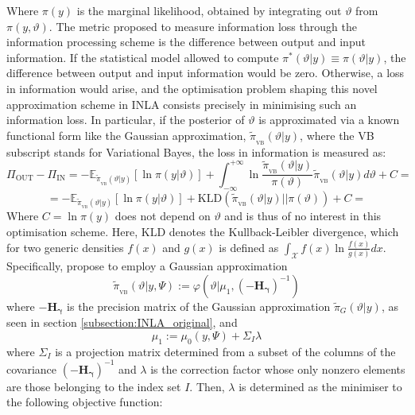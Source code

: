 \documentclass[openany, 11pt, oneside]{book}
\begin{document}
Where $\pi(y)$ is the marginal likelihood, obtained by integrating out $\vartheta$ from $\pi(y,\vartheta)$. The metric \cite{Zellner1988} proposed to measure information loss through the information processing scheme is the difference between output and input information. If the statistical model allowed to compute $\pi^*(\vartheta \vert y) \equiv \pi(\vartheta \vert y)$, the difference between output and input information would be zero. Otherwise, a loss in information would arise, and the optimisation problem shaping this novel approximation scheme in INLA consists precisely in minimising such an information loss. In particular, if the posterior of $\vartheta$ is approximated via a known functional form like the Gaussian approximation, $\tilde{\pi}_\mathrm{_{VB}}(\vartheta \vert y)$, where the VB subscript stands for Variational Bayes, the loss in information is measured as:
$$
\Pi_\mathrm{OUT} - \Pi_\mathrm{IN} = 
-\mathbb{E}_{\tilde{\pi}_\mathrm{_{VB}}(\vartheta\vert y)}\left[ \ln\pi(y \vert \vartheta)\right]+
\int_{-\infty}^{+\infty} \ln\frac{\tilde{\pi}_\mathrm{_{VB}}(\vartheta \vert y)}{\pi(\vartheta)} \tilde{\pi}_\mathrm{_{VB}}(\vartheta \vert y) d\vartheta + C =
$$
$$
= -\mathbb{E}_{\tilde{\pi}_\mathrm{_{VB}}(\vartheta\vert y)}\left[ \ln\pi(y \vert \vartheta)\right]+
\mathrm{KLD} \left( \tilde{\pi}_\mathrm{_{VB}}(\vartheta \vert y) \vert \vert \pi(\vartheta) \right)  + C =
$$
Where $C = \ln \pi(y)$ does not depend on $\vartheta$ and is thus of no interest in this optimisation scheme. Here, $\mathrm{KLD}$ denotes the Kullback-Leibler divergence, which for two generic densities $f(x)$ and $g(x)$ is defined as $\int_\mathcal{X}f(x) \ln\frac{f(x)}{g(x)}dx$. Specifically, \cite{VBINLA2024} propose to employ a Gaussian approximation
%
\begin{equation}
\tilde{\pi}_\mathrm{_{VB}}(\vartheta \vert y, \Psi) := \varphi\left(\vartheta \vert \mu_1, 
\left(-\boldsymbol{H_\gamma}\right)^{-1}\right)
\label{eq:VBNorm}
\end{equation}
%
where $-\boldsymbol{H_\gamma}$ is the precision matrix of the Gaussian approximation $\tilde{\pi}_G(\vartheta \vert y)$, as seen in section \ref{subsection:INLA_original}, and 
$$
\mu_1:=  \mu_0(y,\Psi) + \Sigma_I \lambda
$$
%
where $\Sigma_I$ is a projection matrix determined from a subset of the columns of the covariance $\left(-\boldsymbol{H_\gamma}\right)^{-1}$ and $\lambda$ is the correction factor whose only nonzero elements are those belonging to the index set $I$. Then, $\lambda$ is determined as the minimiser to the following objective function:
\end{document}
